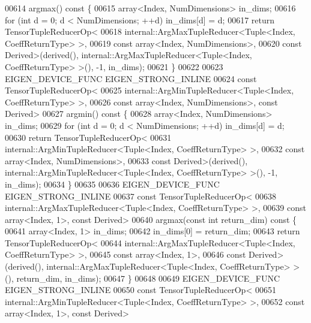 \begin{DoxyCode}
00614     argmax()\textcolor{keyword}{ const }\{
00615       array<Index, NumDimensions> in\_dims;
00616       \textcolor{keywordflow}{for} (\textcolor{keywordtype}{int} d = 0; d < NumDimensions; ++d) in\_dims[d] = d;
00617       \textcolor{keywordflow}{return} TensorTupleReducerOp<
00618         internal::ArgMaxTupleReducer<Tuple<Index, CoeffReturnType> >,
00619         \textcolor{keyword}{const} array<Index, NumDimensions>,
00620         \textcolor{keyword}{const} Derived>(derived(), internal::ArgMaxTupleReducer<Tuple<Index, CoeffReturnType> >(), -1, 
      in\_dims);
00621     \}
00622 
00623     EIGEN\_DEVICE\_FUNC EIGEN\_STRONG\_INLINE
00624     \textcolor{keyword}{const} TensorTupleReducerOp<
00625       internal::ArgMinTupleReducer<Tuple<Index, CoeffReturnType> >,
00626       \textcolor{keyword}{const} array<Index, NumDimensions>, \textcolor{keyword}{const} Derived>
00627     argmin()\textcolor{keyword}{ const }\{
00628       array<Index, NumDimensions> in\_dims;
00629       \textcolor{keywordflow}{for} (\textcolor{keywordtype}{int} d = 0; d < NumDimensions; ++d) in\_dims[d] = d;
00630       \textcolor{keywordflow}{return} TensorTupleReducerOp<
00631         internal::ArgMinTupleReducer<Tuple<Index, CoeffReturnType> >,
00632         \textcolor{keyword}{const} array<Index, NumDimensions>,
00633         \textcolor{keyword}{const} Derived>(derived(), internal::ArgMinTupleReducer<Tuple<Index, CoeffReturnType> >(), -1, 
      in\_dims);
00634     \}
00635 
00636     EIGEN\_DEVICE\_FUNC EIGEN\_STRONG\_INLINE
00637     \textcolor{keyword}{const} TensorTupleReducerOp<
00638       internal::ArgMaxTupleReducer<Tuple<Index, CoeffReturnType> >,
00639       \textcolor{keyword}{const} array<Index, 1>, \textcolor{keyword}{const} Derived>
00640     argmax(\textcolor{keyword}{const} \textcolor{keywordtype}{int} return\_dim)\textcolor{keyword}{ const }\{
00641       array<Index, 1> in\_dims;
00642       in\_dims[0] = return\_dim;
00643       \textcolor{keywordflow}{return} TensorTupleReducerOp<
00644         internal::ArgMaxTupleReducer<Tuple<Index, CoeffReturnType> >,
00645         \textcolor{keyword}{const} array<Index, 1>,
00646         \textcolor{keyword}{const} Derived>(derived(), internal::ArgMaxTupleReducer<Tuple<Index, CoeffReturnType> >(), 
      return\_dim, in\_dims);
00647     \}
00648 
00649     EIGEN\_DEVICE\_FUNC EIGEN\_STRONG\_INLINE
00650     \textcolor{keyword}{const} TensorTupleReducerOp<
00651       internal::ArgMinTupleReducer<Tuple<Index, CoeffReturnType> >,
00652       \textcolor{keyword}{const} array<Index, 1>, \textcolor{keyword}{const} Derived>

\end{DoxyCode}
